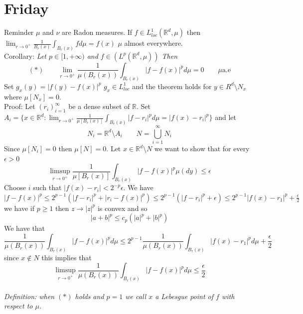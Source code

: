 \documentclass[11pt]{article}
\begin{document}
\section{Friday}
Reminder  $\mu$ and $\nu$ are Radon measures. If  $f \in L^{1}_{loc}( \mathbb{R}^{d}, \mu)$ then $\lim_{r\to 0^{+}} \frac{1}{B_r(x)} \int_{B_r(x)}^{}f d \mu = f(x)$ $\mu$ almost everywhere.
\\
Corollary:
\emph{
    Let $p \in [1, +\infty)$ and $f \in (L^{p}( \mathbb{R}^{d}, \mu))$ Then
    \[
        (*) \qquad \lim_{r\to 0^{+}} \frac{1}{\mu(B_r(x))}\int_{B_r(x)}^{}|f-f(x)|^{p}d \mu = 0 \qquad \mu \text{a.e}
    \] 
}
Set $g_x(y) = |f(y)-f(x)|^{p}$ $g_x \in L^{1}_{loc}$ and the theorem holds for $y \in R^{d} \setminus N_x$ where $\mu[N_x] = 0$.\\
Proof: Let $(r_i)_{i=1}^{\infty}$ be a dense subset of $ \mathbb{R}$. Set $A_i = \{x \in \mathbb{R}^{d}: \lim_{r\to 0^{+}} \frac{1}{\mu[B_r(x)]}\int_{B_r(x)}^{}|f-r_i|^{p} d \mu = |f(x)-r_i|^{p}\}$ and let
\[
    N_i = \mathbb{R}^{d} \setminus A_i \qquad N = \bigcup_{i=1}^{\infty}N_i
\] 
Since $\mu[N_i] = 0$ then $\mu[N] = 0$. Let $x \in \mathbb{R}^{d} \setminus N$ we want to show that for every $\epsilon > 0$
\[
    \limsup_{r\to 0^{+}} \frac{1}{\mu[B_r(x)]}\int_{B_r(x)}^{}|f-f(x)|^{p}\mu(dy) \le \epsilon
\] 
Choose $i$ such that  $|f(x)-r_i| < 2^{-p}\epsilon$. We have $|f-f(x)|^{p} \le 2^{p-1}(|f-r_i|^{p}+|r_i - f(x)|^{p}) \le 2^{p-1}(|f-r_i|^{p}+ \epsilon) \le 2^{p-1}|f(x)-r_1|^{p} + \frac{\epsilon}{2}$ 
we have if $p \ge 1$ then $z \rightarrow |z|^{p}$ is convex and so 
\[
|a+b|^{p} \le c_p (|a|^{p} + |b|^{p})
\] 
We have that 
\[
\frac{1}{\mu(B_r(x))}\int_{B_r(x)}^{}|f-f(x)|^{p}d \mu \le 2^{p-1}\frac{1}{\mu(B_r(x))}\int_{B_r(x)}^{} |f(x)- r_1|^{p} d \mu + \frac{\epsilon}{2}
\] 
since $x \not\in N$ this implies that 
 \[
\limsup_{r\to 0^{+}}\frac{1}{\mu(B_r(x))}\int_{B_r(x)}^{}|f-f(x)|^{p} d \mu \le \frac{\epsilon}{2}
\] 
\\
\emph{
    Definition: when $(*)$ holds and  $p=1$ we call  $x$ a Lebesgue point of $f$ with respect to $\mu$.
}
\end{document}
